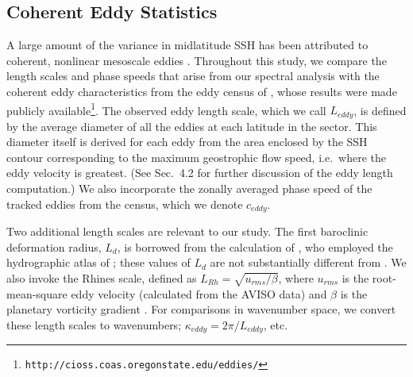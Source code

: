 \documentclass[10pt]{article}
\begin{document}
\subsection{Coherent Eddy Statistics}

A large amount of the variance in midlatitude SSH has been attributed to coherent, nonlinear mesoscale eddies \citep{CheltonEtAl2011}. Throughout this study, we compare the length scales and phase speeds that arise from our spectral analysis with the coherent eddy characteristics from the eddy census of \citet{CheltonEtAl2011}, whose results were made publicly available\footnote{{\tt http://cioss.coas.oregonstate.edu/eddies/}}. The observed eddy length scale, which we call $L_{eddy}$, is defined by the average diameter of all the eddies at each latitude in the sector. This diameter itself is derived for each eddy from the area enclosed by the SSH contour corresponding to the maximum geostrophic flow speed, i.e.~where the eddy velocity is greatest. (See \citealt{CheltonEtAl2011} Sec.~4.2 for further discussion of the eddy length computation.) We also incorporate the zonally averaged phase speed of the tracked eddies from the census, which we denote $c_{eddy}$.

Two additional length scales are relevant to our study. The first baroclinic deformation radius, $L_d$, is borrowed from the calculation of \citet{TullochEtAl2009}, who employed the hydrographic atlas of \citet{Forget2010}; these values of $L_d$ are not substantially different from \citet{CheltonEtAl1998}. We also invoke the Rhines scale, defined as $L_{Rh} = \sqrt{u_{rms} / \beta}$, where $u_{rms}$ is the root-mean-square eddy velocity (calculated from the AVISO data) and $\beta$ is the planetary vorticity gradient \citep{Rhines1975}. For comparisons in wavenumber space, we convert these length scales to wavenumbers; $\kappa_{eddy} = 2 \pi / L_{eddy}$, etc.

\end{document}
